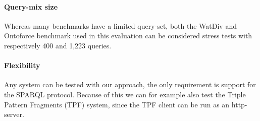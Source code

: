 \paragraph{Query-mix size} Whereas many benchmarks have a limited query-set, both the WatDiv and Ontoforce benchmark used in this evaluation can be considered stress tests with respectively 400 and 1,223 queries. 

\paragraph{Flexibility} Any system can be tested with our approach, the only requirement is support for the SPARQL protocol. Because of this we can for example also test the Triple Pattern Fragments (TPF) system, since the TPF client can be run as an http-server.
